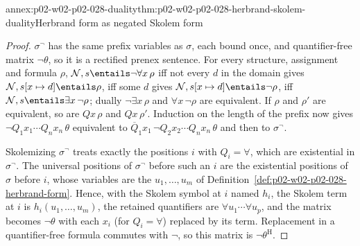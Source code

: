 \begin{annexitem}{annex:p02-w02-p02-028-duality}{thm:p02-w02-p02-028-herbrand-skolem-duality}{Herbrand form as negated Skolem form}
\begin{proof}
\(\sigma^{\neg}\) has the same prefix variables as \(\sigma\), each bound
once, and quantifier-free matrix \(\neg\theta\), so it is a rectified prenex
sentence.  For every structure, assignment and formula \(\rho\),
\(\mathcal N,s\entails\neg\forall x\,\rho\) iff not every \(d\) in the domain
gives \(\mathcal N,s[x\mapsto d]\entails\rho\), iff some \(d\) gives
\(\mathcal N,s[x\mapsto d]\entails\neg\rho\), iff
\(\mathcal N,s\entails\exists x\,\neg\rho\); dually
\(\neg\exists x\,\rho\) and \(\forall x\,\neg\rho\) are equivalent.  If
\(\rho\) and \(\rho'\) are equivalent, so are \(Qx\,\rho\) and
\(Qx\,\rho'\).  Induction on the length of the prefix now gives
\(\neg Q_1x_1\cdots Q_nx_n\,\theta\) equivalent to
\(\overline Q_1x_1\,\neg Q_2x_2\cdots Q_nx_n\,\theta\) and then to
\(\sigma^{\neg}\).

Skolemizing \(\sigma^{\neg}\) treats exactly the positions \(i\) with
\(Q_i=\forall\), which are existential in \(\sigma^{\neg}\).  The universal
positions of \(\sigma^{\neg}\) before such an \(i\) are the existential
positions of \(\sigma\) before \(i\), whose variables are the \(u_1,\ldots,u_m\)
of Definition~\ref{def:p02-w02-p02-028-herbrand-form}.  Hence, with the
Skolem symbol at \(i\) named \(h_i\), the Skolem term at \(i\) is
\(h_i(u_1,\ldots,u_m)\), the retained quantifiers are
\(\forall u_1\cdots\forall u_p\), and the matrix becomes \(\neg\theta\) with
each \(x_i\) (for \(Q_i=\forall\)) replaced by its term.  Replacement in a
quantifier-free formula commutes with \(\neg\), so this matrix is
\(\neg\theta^{\mathrm H}\).
\end{proof}
\end{annexitem}

